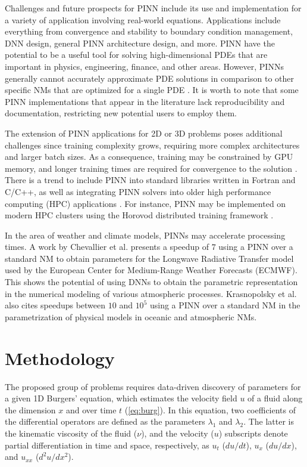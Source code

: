 \documentclass[conference]{IEEEtran}
\begin{document}
Challenges and future prospects for PINN include its use and implementation for a variety of application involving real-world equations. Applications include everything from convergence and stability to boundary condition management, DNN design, general PINN architecture design, and more. PINN have the potential to be a useful tool for solving high-dimensional PDEs that are important in physics, engineering, finance, and other areas. However, PINNs generally cannot accurately approximate PDE solutions in comparison to other specific NMs that are optimized for a single PDE \cite{Cuomo2022}. It is worth to note that some PINN implementations that appear in the literature lack reproducibility and documentation, restricting new potential users to employ them.

The extension of PINN applications for 2D or 3D problems poses additional challenges since training complexity grows, requiring more complex architectures and larger batch sizes. As a consequence, training may be constrained by GPU memory, and longer training times are required for convergence to the solution \cite{Nandi2021}. There is a trend to include PINN into standard libraries written in Fortran and C/C++, as well as integrating PINN solvers into older high performance computing (HPC) applications \cite{Markidis2021}. For instance, PINN may be implemented on modern HPC clusters using the Horovod distributed training framework \cite{Sergeev2018}.

In the area of weather and climate models, PINNs may accelerate processing times. A work by Chevallier et al. \cite{Chevallier2000} presents a speedup of $7$ using a PINN over a standard NM to obtain parameters for the Longwave Radiative Transfer model used by the European Center for Medium-Range Weather Forecasts (ECMWF). This shows the potential of using DNNs to obtain the parametric representation in the numerical modeling of various atmospheric processes.
Krasnopolsky et al. \cite{Krasnopolsky2006} also cites speedups between $10$ and $10^5$ using a PINN over a standard NM in the parametrization of physical models in oceanic and atmospheric NMs.

\section{Methodology}
\label{sec:meth}

The proposed group of problems requires data-driven discovery of parameters for a given 1D Burgers' equation, which estimates the velocity field $u$ of a fluid along the dimension $x$ and over time $t$ (\autoref{eq:burg}). In this equation, two coefficients of the differential operators are defined as the parameters $\lambda_1$ and $\lambda_2$. The latter is the kinematic viscosity of the fluid ($\nu$), and the velocity ($u$) subscripts denote partial differentiation in time and space, respectively, as $u_t$ (${du}/{dt}$), $u_x$ (${du}/{dx}$), and $u_{xx}$ (${d^2u}/{dx^2}$).
\end{document}
